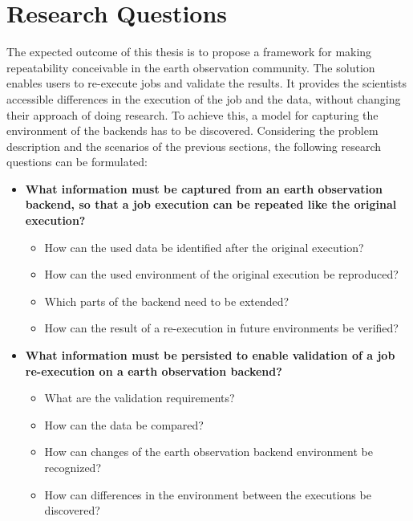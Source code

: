 \documentclass[draft,final]{vutinfth} %
\begin{document}
\section{Research Questions}\label{research question}\label{Aim}
The expected outcome of this thesis is to propose a framework for making repeatability conceivable in the earth observation community. The solution enables users to re-execute jobs and validate the results. It provides the scientists accessible differences in the execution of the job and the data, without changing their approach of doing research. To achieve this, a model for capturing the environment of the backends has to be discovered. Considering the problem description and the scenarios of the previous sections, the following research questions can be formulated:

\begin{itemize}
	\item \textbf{What information must be captured from an earth observation backend, so that a job execution can be repeated like the original execution?}
	\begin{itemize}
		\item How can the used data be identified after the original execution?
		\item How can the used environment of the original execution be reproduced?
		\item Which parts of the backend need to be extended?
		\item How can the result of a re-execution in future environments be verified?
	\end{itemize}
	\item \textbf{What information must be persisted to enable validation of a job re-execution on a earth observation backend?}
	\begin{itemize}
		\item What are the validation requirements?
		\item How can the data be compared?
		\item How can changes of the earth observation backend environment be recognized?
		\item How can differences in the environment between the executions be discovered?
	\end{itemize}
\end{itemize}
\end{document}
